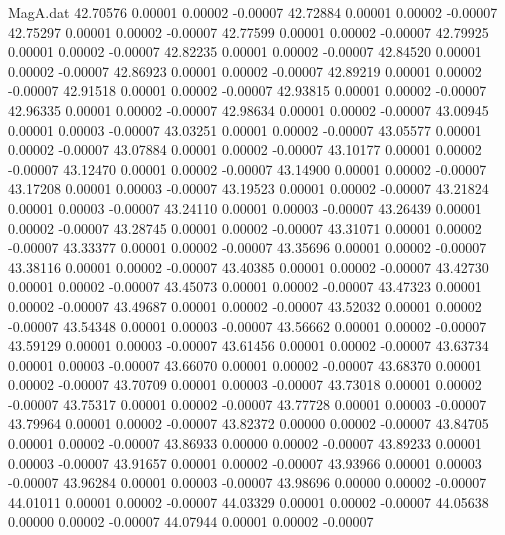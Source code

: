 \begin{filecontents}{MagA.dat}
  42.70576    0.00001    0.00002   -0.00007
  42.72884    0.00001    0.00002   -0.00007
  42.75297    0.00001    0.00002   -0.00007
  42.77599    0.00001    0.00002   -0.00007
  42.79925    0.00001    0.00002   -0.00007
  42.82235    0.00001    0.00002   -0.00007
  42.84520    0.00001    0.00002   -0.00007
  42.86923    0.00001    0.00002   -0.00007
  42.89219    0.00001    0.00002   -0.00007
  42.91518    0.00001    0.00002   -0.00007
  42.93815    0.00001    0.00002   -0.00007
  42.96335    0.00001    0.00002   -0.00007
  42.98634    0.00001    0.00002   -0.00007
  43.00945    0.00001    0.00003   -0.00007
  43.03251    0.00001    0.00002   -0.00007
  43.05577    0.00001    0.00002   -0.00007
  43.07884    0.00001    0.00002   -0.00007
  43.10177    0.00001    0.00002   -0.00007
  43.12470    0.00001    0.00002   -0.00007
  43.14900    0.00001    0.00002   -0.00007
  43.17208    0.00001    0.00003   -0.00007
  43.19523    0.00001    0.00002   -0.00007
  43.21824    0.00001    0.00003   -0.00007
  43.24110    0.00001    0.00003   -0.00007
  43.26439    0.00001    0.00002   -0.00007
  43.28745    0.00001    0.00002   -0.00007
  43.31071    0.00001    0.00002   -0.00007
  43.33377    0.00001    0.00002   -0.00007
  43.35696    0.00001    0.00002   -0.00007
  43.38116    0.00001    0.00002   -0.00007
  43.40385    0.00001    0.00002   -0.00007
  43.42730    0.00001    0.00002   -0.00007
  43.45073    0.00001    0.00002   -0.00007
  43.47323    0.00001    0.00002   -0.00007
  43.49687    0.00001    0.00002   -0.00007
  43.52032    0.00001    0.00002   -0.00007
  43.54348    0.00001    0.00003   -0.00007
  43.56662    0.00001    0.00002   -0.00007
  43.59129    0.00001    0.00003   -0.00007
  43.61456    0.00001    0.00002   -0.00007
  43.63734    0.00001    0.00003   -0.00007
  43.66070    0.00001    0.00002   -0.00007
  43.68370    0.00001    0.00002   -0.00007
  43.70709    0.00001    0.00003   -0.00007
  43.73018    0.00001    0.00002   -0.00007
  43.75317    0.00001    0.00002   -0.00007
  43.77728    0.00001    0.00003   -0.00007
  43.79964    0.00001    0.00002   -0.00007
  43.82372    0.00000    0.00002   -0.00007
  43.84705    0.00001    0.00002   -0.00007
  43.86933    0.00000    0.00002   -0.00007
  43.89233    0.00001    0.00003   -0.00007
  43.91657    0.00001    0.00002   -0.00007
  43.93966    0.00001    0.00003   -0.00007
  43.96284    0.00001    0.00003   -0.00007
  43.98696    0.00000    0.00002   -0.00007
  44.01011    0.00001    0.00002   -0.00007
  44.03329    0.00001    0.00002   -0.00007
  44.05638    0.00000    0.00002   -0.00007
  44.07944    0.00001    0.00002   -0.00007

\end{filecontents}
